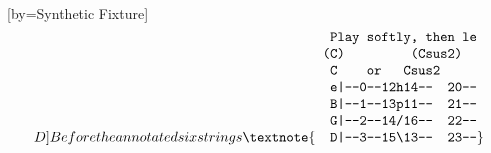 \documentclass[12pt]{article}
\begin{document}
\begin{songs}{}
[by={Synthetic Fixture}]
\beginverse
\[D]Before the annotated six strings
\textnote{\vbox{\fontencoding{OT1}\fontfamily{cmtt}\fontsize{10}{12}\selectfont
\setbox0=\hbox{\char48\relax}\dimen0=\wd0\relax
\hbox{\hskip\dimen0\relax \hskip\dimen0\relax \char80\relax \char108\relax \char97\relax \char121\relax \hskip\dimen0\relax \char115\relax \char111\relax \char102\relax \char116\relax \char108\relax \char121\relax \char44\relax \hskip\dimen0\relax \char116\relax \char104\relax \char101\relax \char110\relax \hskip\dimen0\relax \char108\relax \char101\relax }
\hbox{\hskip\dimen0\relax \char40\relax \char67\relax \char41\relax \hskip\dimen0\relax \hskip\dimen0\relax \hskip\dimen0\relax \hskip\dimen0\relax \hskip\dimen0\relax \hskip\dimen0\relax \hskip\dimen0\relax \hskip\dimen0\relax \hskip\dimen0\relax \char40\relax \char67\relax \char115\relax \char117\relax \char115\relax \char50\relax \char41\relax \hskip\dimen0\relax \hskip\dimen0\relax }
\hbox{\hskip\dimen0\relax \hskip\dimen0\relax \char67\relax \hskip\dimen0\relax \hskip\dimen0\relax \hskip\dimen0\relax \hskip\dimen0\relax \char111\relax \char114\relax \hskip\dimen0\relax \hskip\dimen0\relax \hskip\dimen0\relax \char67\relax \char115\relax \char117\relax \char115\relax \char50\relax \hskip\dimen0\relax \hskip\dimen0\relax \hskip\dimen0\relax \hskip\dimen0\relax \hskip\dimen0\relax }
\hbox{\hskip\dimen0\relax \hskip\dimen0\relax \char101\relax \char124\relax \char45\relax \char45\relax \char48\relax \char45\relax \char45\relax \char49\relax \char50\relax \char104\relax \char49\relax \char52\relax \char45\relax \char45\relax \hskip\dimen0\relax \hskip\dimen0\relax \char50\relax \char48\relax \char45\relax \char45\relax }
\hbox{\hskip\dimen0\relax \hskip\dimen0\relax \char66\relax \char124\relax \char45\relax \char45\relax \char49\relax \char45\relax \char45\relax \char49\relax \char51\relax \char112\relax \char49\relax \char49\relax \char45\relax \char45\relax \hskip\dimen0\relax \hskip\dimen0\relax \char50\relax \char49\relax \char45\relax \char45\relax }
\hbox{\hskip\dimen0\relax \hskip\dimen0\relax \char71\relax \char124\relax \char45\relax \char45\relax \char50\relax \char45\relax \char45\relax \char49\relax \char52\relax \char47\relax \char49\relax \char54\relax \char45\relax \char45\relax \hskip\dimen0\relax \hskip\dimen0\relax \char50\relax \char50\relax \char45\relax \char45\relax }
\hbox{\hskip\dimen0\relax \hskip\dimen0\relax \char68\relax \char124\relax \char45\relax \char45\relax \char51\relax \char45\relax \char45\relax \char49\relax \char53\relax \char92\relax \char49\relax \char51\relax \char45\relax \char45\relax \hskip\dimen0\relax \hskip\dimen0\relax \char50\relax \char51\relax \char45\relax \char45\relax }
}}\]
\end{songs}
\end{document}
